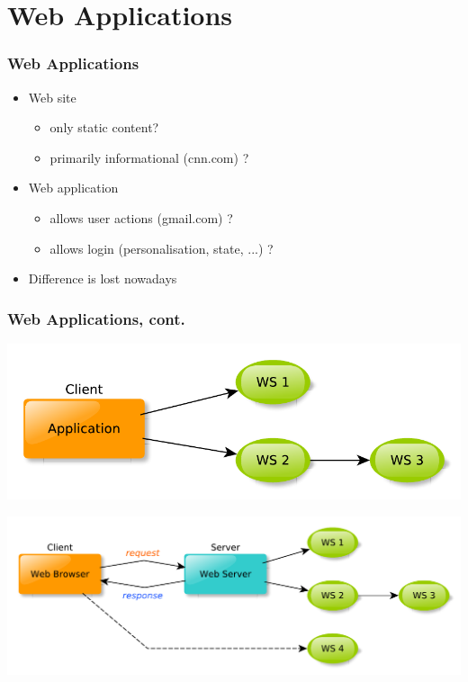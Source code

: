 \documentclass{beamer}
\begin{document}
\section{Web Applications} 
\begin{frame}\frametitle{Web Applications} 
  \begin{itemize}
    
    \item Web site
    \begin{itemize}
      \item only static content?
      \item primarily informational (cnn.com) ?
    \end{itemize}                     \pause


    \item Web application
    \begin{itemize}
      \item allows user actions (gmail.com) ?
      \item allows login (personalisation, state, ...) ?
    \end{itemize}                                \pause

    \item Difference is lost nowadays
    
  \end{itemize}
\end{frame}




\begin{frame}\frametitle{Web Applications, cont.} 

  \begin{center}
    \includegraphics[scale=0.55]{diagrams/app_web_services.pdf}  
  \end{center}

  \pause
  
  \begin{center}
    \includegraphics[scale=0.55]{diagrams/webapp_web_services.pdf}  
  \end{center}
  
\end{frame}
\end{document}

